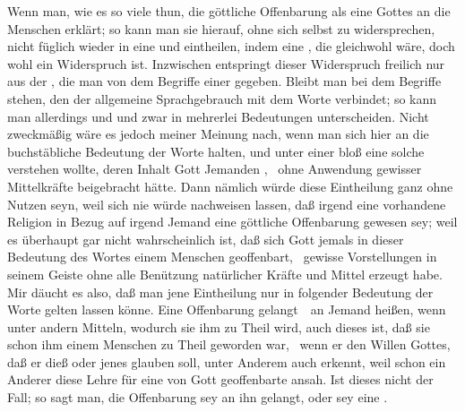 \begin{aufza}
\item Wenn man, wie es so viele thun, die göttliche Offenbarung als eine  Gottes an die Menschen erklärt; so kann man sie hierauf, ohne sich selbst zu widersprechen, nicht füglich wieder in eine  und  eintheilen, indem eine , die gleichwohl  wäre, doch wohl ein Widerspruch ist. Inzwischen entspringt dieser Widerspruch freilich nur aus der , die man von dem Begriffe einer  gegeben. Bleibt man bei dem Begriffe stehen, den der allgemeine Sprachgebrauch mit dem Worte  verbindet; so kann man allerdings  und  und zwar in mehrerlei Bedeutungen unterscheiden. Nicht zweckmäßig wäre es jedoch meiner Meinung nach, wenn man sich hier an die buchstäbliche Bedeutung der Worte halten, und unter einer  bloß eine solche verstehen wollte, deren Inhalt Gott Jemanden , \dh\ ohne Anwendung gewisser Mittelkräfte beigebracht hätte. Dann nämlich würde diese Eintheilung ganz ohne Nutzen seyn, weil sich nie würde nachweisen lassen, daß irgend eine vorhandene Religion in Bezug auf irgend Jemand eine  göttliche Offenbarung gewesen sey; weil es überhaupt gar nicht wahrscheinlich ist, daß sich Gott jemals in dieser Bedeutung des Wortes einem Menschen  geoffenbart, \dh\ gewisse Vorstellungen in seinem Geiste ohne alle Benützung natürlicher Kräfte und Mittel erzeugt habe. Mir däucht es also, daß man jene Eintheilung nur in folgender Bedeutung der Worte gelten lassen könne. Eine Offenbarung gelangt~\ an Jemand  heißen, wenn unter andern Mitteln, wodurch sie ihm zu Theil wird, auch dieses ist, daß sie schon  ihm einem  Menschen zu Theil geworden war, \dh\ wenn er den Willen Gottes, daß er dieß oder jenes glauben soll, unter Anderem auch  erkennt, weil schon ein Anderer diese Lehre für eine von Gott geoffenbarte ansah. Ist dieses nicht der Fall; so sagt man, die Offenbarung sey an ihn  gelangt, oder sey eine .

\end{aufza}
